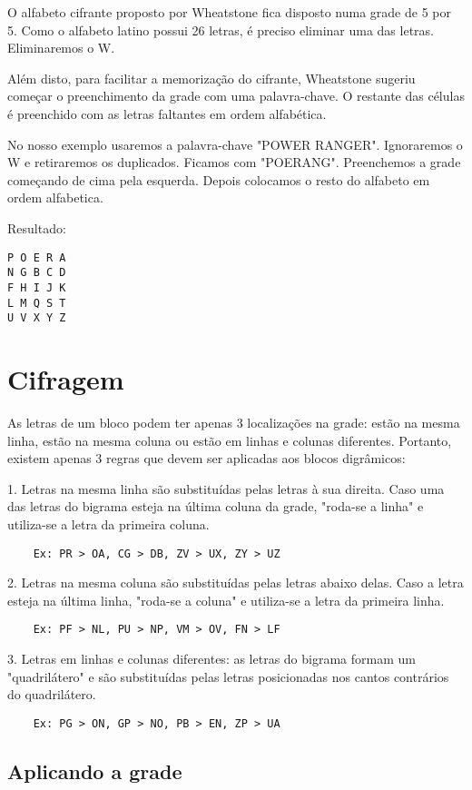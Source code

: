 \documentclass[12pt]{article}
\begin{document}
O alfabeto cifrante proposto por Wheatstone fica disposto numa grade de 5 por 5. Como o alfabeto latino possui 26 letras, é preciso eliminar uma das letras. Eliminaremos o W. 

Além disto, para facilitar a memorização do cifrante, Wheatstone sugeriu começar o preenchimento da grade com uma palavra-chave. O restante das células é preenchido com as letras faltantes em ordem alfabética.

No nosso exemplo usaremos a palavra-chave "POWER RANGER". Ignoraremos o W e retiraremos os duplicados. Ficamos com "POERANG". Preenchemos a
grade começando de cima pela esquerda. Depois
colocamos o resto do alfabeto em ordem alfabetica.

Resultado:
\begin{verbatim}
P O E R A
N G B C D
F H I J K
L M Q S T 
U V X Y Z
\end{verbatim}

\section{Cifragem}
As letras de um bloco podem ter apenas 3 localizações na grade: estão na mesma linha, estão na mesma coluna ou estão em linhas e colunas diferentes. Portanto, existem apenas 3 regras que devem ser aplicadas aos blocos digrâmicos:

1. Letras na mesma linha são substituídas pelas letras à sua direita. Caso uma das letras do bigrama esteja na última coluna da grade, "roda-se a linha" e utiliza-se a letra da primeira coluna.
\begin{verbatim}
    Ex: PR > OA, CG > DB, ZV > UX, ZY > UZ
\end{verbatim}
2. Letras na mesma coluna são substituídas pelas letras abaixo delas. Caso a letra esteja na última linha, "roda-se a coluna" e utiliza-se a letra da primeira linha.
\begin{verbatim}
    Ex: PF > NL, PU > NP, VM > OV, FN > LF
\end{verbatim}
3. Letras em linhas e colunas diferentes: as letras do bigrama formam um "quadrilátero" e são substituídas pelas letras posicionadas nos cantos contrários do quadrilátero.
\begin{verbatim}
    Ex: PG > ON, GP > NO, PB > EN, ZP > UA
\end{verbatim}
\subsection{Aplicando a grade}
\end{document}
